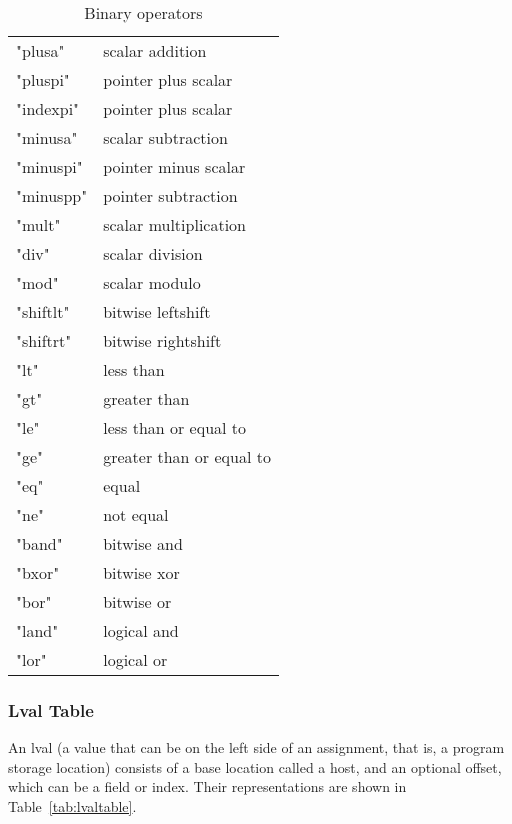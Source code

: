 \documentclass[11pt]{article}
\begin{document}
\begin{table}[t]
\centering
\begin{tabular}{l|l} \hline
"plusa" & scalar addition \\
"pluspi" & pointer plus scalar \\
"indexpi" & pointer plus scalar\\
"minusa" & scalar subtraction \\
"minuspi" & pointer minus scalar \\
"minuspp" & pointer subtraction \\
"mult" & scalar multiplication \\
"div" & scalar division \\
"mod" & scalar modulo \\
"shiftlt" & bitwise leftshift \\
"shiftrt" & bitwise rightshift \\
"lt" & less than \\
"gt" & greater than \\
"le" & less than or equal to \\
"ge" & greater than or equal to \\
"eq" & equal \\
"ne" & not equal \\
"band" & bitwise and \\
"bxor" & bitwise xor \\
"bor" & bitwise or \\
"land" & logical and \\
"lor" & logical or
\end{tabular}
\caption{\label{tab:binop}Binary operators}
\end{table}

\subsubsection{Lval Table}

An lval (a value that can be on the left side of an assignment, that is, a
program storage location) consists of a base location called a host, and an
optional offset, which can be a field or index. Their representations are
shown in Table~\ref{tab:lvaltable}.
\end{document}

